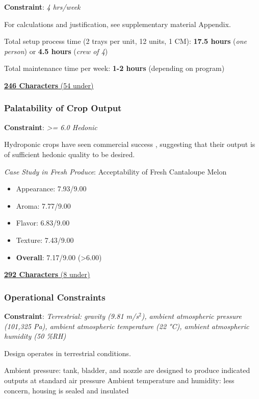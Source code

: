 \documentclass{report}
\begin{document}
\textbf{Constraint}: \textit{4 hrs/week}

For calculations and justification, see supplementary material Appendix.

Total setup process time (2 trays per unit, 12 units, 1 CM): \textbf{17.5 hours} (\textit{one person}) or \textbf{4.5 hours} (\textit{crew of 4})

Total maintenance time per week: \textbf{1-2 hours} (depending on program)

\uline{\textbf{246 Characters} (54 under)}

\subsubsection{Palatability of Crop Output} 
\label{sec:constraints-palatability}

\textbf{Constraint}: \textit{>= 6.0 Hedonic}

Hydroponic crops have seen commercial success \cite{commercialhydro}, suggesting that their output is of sufficient hedonic quality to be desired.

\textit{Case Study in Fresh Produce}: Acceptability of Fresh Cantaloupe Melon \cite{melon}

\begin{itemize}
    \item Appearance: 7.93/9.00
    \item Aroma: 7.77/9.00
    \item Flavor: 6.83/9.00
    \item Texture: 7.43/9.00
    \item \textbf{Overall}: 7.17/9.00 (>6.00)
\end{itemize}

\uline{\textbf{292 Characters} (8 under)}

\subsubsection{Operational Constraints} 
\label{sec:constraints-operational}

\textbf{Constraint}: \textit{Terrestrial: gravity (9.81 m/s${}^2$), ambient atmospheric pressure (101,325 Pa), ambient atmospheric temperature (22 °C), ambient atmospheric humidity (50 \%RH)}

Design operates in terrestrial conditions.

Ambient pressure: tank, bladder, and nozzle are designed to produce indicated outputs at standard air pressure
Ambient temperature and humidity: less concern, housing is sealed and insulated
\end{document}
